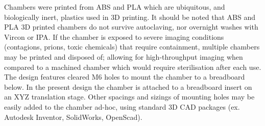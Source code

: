 Chambers were printed from ABS and PLA which are ubiquitous, and biologically inert, plastics used in \gls{3D printing}.
It should be noted that ABS and PLA 3D printed chambers do not survive autoclaving, nor overnight washes with Vircon or IPA.
If the chamber is exposed to severe imaging conditions (contagions, prions, toxic chemicals) that require containment, multiple chambers may be printed and disposed of; allowing for high-throughput imaging when compared to a machined chamber which would require sterilisation after each use.
The design features cleared M6 holes to mount the chamber to a breadboard below.
In the present design the chamber is attached to a breadboard insert on an XYZ translation stage.
Other spacings and sizings of mounting holes may be easily added to the chamber ad-hoc, using standard \gls{3D} \gls{CAD} packages (ex. Autodesk Inventor, SolidWorks, OpenScad).


